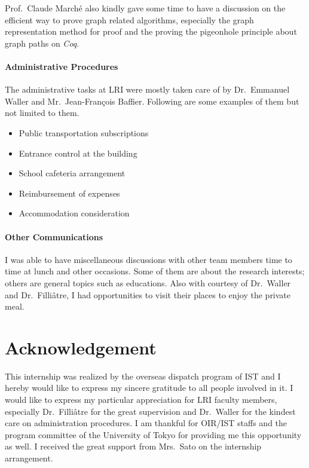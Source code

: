 \documentclass[a4paper,10.5pt]{article}
\begin{document}
Prof.\ Claude March\' e also kindly gave some time to have a
discussion on the efficient way to prove graph related algorithms,
especially the graph representation method for proof and the proving
the pigeonhole principle about graph paths on \emph{Coq}.

\paragraph{Administrative Procedures}

The administrative tasks at LRI were mostly taken care of by
Dr.\ Emmanuel Waller and Mr.\ Jean-Fran\c cois Baffier. Following are
some examples of them but not limited to them.

\begin{itemize}\itemsep-3pt
\item Public transportation subscriptions
\item Entrance control at the building
\item School cafeteria arrangement
\item Reimbursement of expenses
\item Accommodation consideration
\end{itemize}

\paragraph{Other Communications}

I was able to have miscellaneous discussions with other team members
time to time at lunch and other occasions. Some of them are about the
research interests; others are general topics such as educations. Also
with courtesy of Dr.\ Waller and Dr.\ Filli\^atre, I had opportunities
to visit their places to enjoy the private meal.

\section*{Acknowledgement}

This internship was realized by the overseas dispatch program of IST
and I hereby would like to express my sincere gratitude to all people
involved in it. I would like to express my particular appreciation for
LRI faculty members, especially Dr.\ Filli\^atre for the great
supervision and Dr.\ Waller for the kindest care on administration
procedures. I am thankful for OIR/IST staffs and the program committee
of the University of Tokyo for providing me this opportunity as well.
I received the great support from Mrs.\ Sato on the internship
arrangement.



\end{document}
